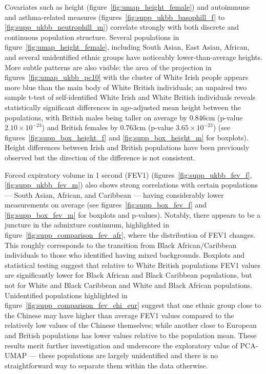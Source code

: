 \documentclass[12pt]{pnas-new}
\begin{document}
Covariates such as height (figure~\ref{fig:umap_height_female}) and autoimmune and asthma-related measures  (figures~\ref{fig:supp_ukbb_basophill_f} to \ref{fig:supp_ukbb_neutrophill_m}) correlate strongly with both discrete and continuous population structure. Several populations in figure~\ref{fig:umap_height_female}, including South Asian, East Asian, African, and several unidentified ethnic groups have noticeably lower-than-average heights. More subtle patterns are also visible: the area of the projection in figures~\ref{fig:umap_ukbb_pc10} with the cluster of White Irish people appears more blue than the main body of White British individuals; an unpaired two sample t-test of self-identified White Irish and White British individuals reveals statistically significant differences in age-adjusted mean height between the populations, with British males being taller on average by 0.846cm (p-value $2.10\times 10^{-23}$) and British females by 0.763cm (p-value $3.65\times 10^{-23}$) (see figures~\ref{fig:supp_box_height_f} and \ref{fig:supp_box_height_m} for boxplots). Height differences between Irish and British populations have been previously observed but the direction of the difference is not consistent\cite{robinson2015population,komlos1994stature}.

Forced expiratory volume in 1 second (FEV1) (figures~\ref{fig:supp_ukbb_fev_f}, \ref{fig:supp_ukbb_fev_m}) also shows strong correlations with certain populations --- South Asian, African, and Caribbean --- having considerably lower measurements on average (see figures~\ref{fig:supp_box_fev_f} and \ref{fig:supp_box_fev_m} for boxplots and p-values). Notably, there appears to be a juncture in the admixture continuum, highlighted in figure~\ref{fig:supp_comparison_fev_afr}, where the distribution of FEV1 changes. This roughly corresponds to the transition from Black African/Caribbean individuals to those who identified having mixed backgrounds. Boxplots and statistical testing suggest that relative to White British populations FEV1 values are significantly lower for Black African and Black Caribbean populations, but not for White and Black Caribbean and White and Black African populations. Unidentified populations highlighted in figure~\ref{fig:supp_comparison_fev_chi_eur} suggest that one ethnic group close to the Chinese may have higher than average FEV1 values compared to the relatively low values of the Chinese themselves; while another close to European and British populations has lower values relative to the population mean. These results merit further investigation and underscore the exploratory value of PCA-UMAP --- these  populations are largely unidentified and there is no straightforward way to separate them within the data otherwise.
\end{document}
